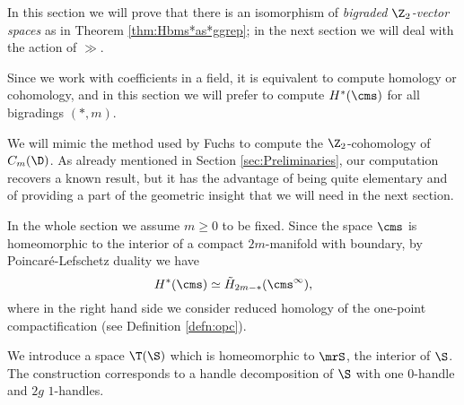 In this section we will prove that there is an isomorphism of \emph{bigraded $\Z_2$-vector spaces}
as in Theorem \ref{thm:Hbms*as*ggrep}; in the next section we will deal with the action of
$\gg$.

Since we work with coefficients in a field, it is equivalent to compute homology or cohomology,
and in this section we will prefer to compute $H^*(\cms)$ for all bigradings $(*,m)$.

We will mimic the method used by Fuchs \cite{Fuchs:CohomBraidModtwo} to compute the $\Z_2$-cohomology
of $C_m(\D)$.
As already mentioned in Section \ref{sec:Preliminaries}, our computation recovers a known result, but it has the advantage of
being quite elementary and of providing a part of
the geometric insight that we will need in the next section.

In the whole section we assume $m\geq 0$ to be fixed.
Since the space $\cms$ is homeomorphic to the interior of a compact
$2m$-manifold with boundary, by Poincaré-Lefschetz
duality we have
\[
 H^*(\cms)\simeq \tilde H_{2m-*}(\cms^{\infty}),
\]
where in the right hand side we consider reduced homology of the one-point compactification (see Definition \ref{defn:opc}).

We introduce a space $\T(\S)$ which is homeomorphic to $\mrS$, the interior of $\S$. The construction
corresponds to a handle decomposition of $\S$ with one $0$-handle and $2g$ $1$-handles.

